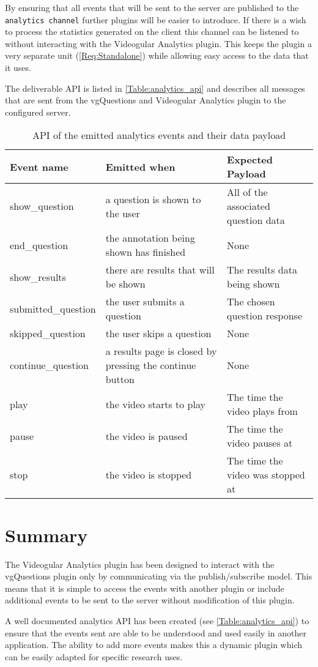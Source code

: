By ensuring that all events that will be sent to the server are published to the \lstinline|analytics channel| further plugins will be easier to introduce. If there is a wish to process the statistics generated on the client this channel can be listened to without interacting with the \gls{Videogular} Analytics plugin. This keeps the plugin a very separate unit (\cref{Req:Standalone}) while allowing easy access to the data that it uses.

The deliverable \gls{API} is listed in \autoref{Table:analytics_api} and describes all messages that are sent from the \gls{vgQuestions} and  \gls{Videogular} Analytics plugin to the configured server.

\begin{table}[h]
\caption{\label{Table:analytics_api}API of the emitted analytics events and their data payload}
\begin{tabular}{p{3.2cm} p{6cm} p{4cm}}
\textbf{Event name} & \textbf{Emitted when} & \textbf{Expected Payload} \\
\hline
show\_question & a question is shown to the user & All of the associated question data \\
\hline
end\_question & the annotation being shown has finished & None \\
\hline
show\_results & there are results that will be shown & The results data being shown \\
\hline
submitted\_question & the user submits a question & The chosen question response \\
\hline
skipped\_question & the user skips a question & None \\
\hline
continue\_question & a results page is closed by pressing the continue button & None \\
\hline
play & the video starts to play & The time the video plays from \\
\hline
pause & the video is paused & The time the video pauses at \\
\hline
stop & the video is stopped & The time the video was stopped at \\
\end{tabular}
\end{table}

\section{Summary}

The \gls{Videogular} Analytics plugin has been designed to interact with the \gls{vgQuestions} plugin only by communicating via the publish/subscribe model. This means that it is simple to access the events with another plugin or include additional events to be sent to the server without modification of this plugin.

A well documented analytics \gls{API} has been created (see \autoref{Table:analytics_api}) to ensure that the events sent are able to be understood and used easily in another application. The ability to add more events makes this a dynamic plugin which can be easily adapted for specific research uses.